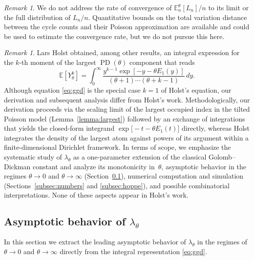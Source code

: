 \documentclass{amsart}
\theoremstyle{definition}
\theoremstyle{remark}
\newtheorem{remark}[theorem]{Remark}
\numberwithin{equation}{section}
\newcommand{\EE}{\mathbb{E}}
\DeclareMathOperator{\PD}{PD}
\begin{document}
\begin{remark}
\label{rmk:didnot}
We do not address the rate of convergence of $\EE_{n}^{\theta}[L_{n}]/n$ to its limit or the full distribution of $L_{n}/n$. Quantitative bounds on the total variation distance between the cycle counts and their Poisson approximation are available \cite{Arratia1992,Ford2022} and could be used to estimate the convergence rate, but we do not pursue this here.
\end{remark}

\begin{remark}
\label{rmk:holst}
Lars Holst obtained, among other results, an integral expression for the $k$-th moment of the largest $\PD(\theta)$ component that reads \cite[Proposition~2.2]{Holst2001}
\begin{equation}
\label{eq:holst}
\EE[Y_{\theta}^{k}] = \int_{0}^{\infty} \dfrac{y^{k-1} \exp[-y-\theta E_{1}(y)]}{(\theta+1)\cdots(\theta+k-1)}\,dy.
\end{equation}
Although equation \eqref{eq:ggd} is the special case $k=1$ of Holst's equation, our derivation and subsequent analysis differ from Holst's work. Methodologically, our derivation proceeds via the scaling limit of the largest occupied index in the tilted Poisson model (Lemma~\ref{lemma:largest}) followed by an exchange of integrations that yields the closed-form integrand $\exp\bigl[-t-\theta E_{1}(t)\bigr]$ directly, whereas Holst integrates the density of the largest atom against powers of its argument within a finite-dimensional Dirichlet framework. In terms of scope, we emphasize the systematic study of $\lambda_{\theta}$ as a one-parameter extension of the classical Golomb--Dickman constant and analyze its monotonicity in~$\theta$, asymptotic behavior in the regimes $\theta \to 0$ and $\theta \to \infty$ (Section~\ref{sec:asymptotics}), numerical computation and simulation (Sections~\ref{subsec:numbers} and \ref{subsec:hoppe}), and possible combinatorial interpretations. None of these aspects appear in Holst's work.
\end{remark}


\subsection{Asymptotic behavior of $\lambda_{\theta}$}
\label{sec:asymptotics}

In this section we extract the leading asymptotic behavior of $\lambda_{\theta}$ in the regimes of $\theta \to 0$ and $\theta \to \infty$ directly from the integral representation \eqref{eq:ggd}.
\end{document}
